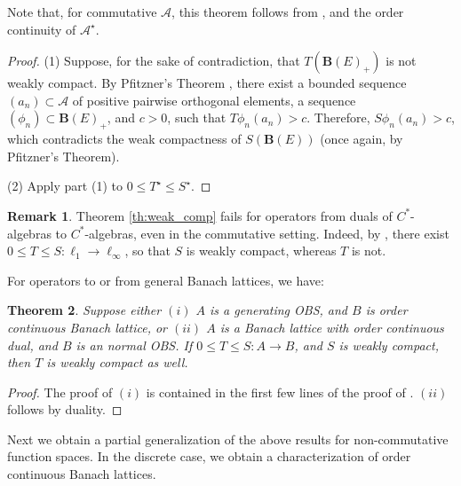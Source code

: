\documentclass[12pt]{amsart}
\theoremstyle{plain}
\newtheorem{theorem}{Theorem}[subsection]
\theoremstyle{definition}
\newtheorem{remark}[theorem]{Remark}
\renewcommand{\leq}{\leqslant}
\newcommand{\ball}{\mathbf{B}}
\newcommand{\A}{\mathcal{A}}
\begin{document}
Note that, for commutative $\A$, this theorem follows from
\cite{Wi81}, and the order continuity of $\A^\star$.

\begin{proof}
(1)
Suppose, for the sake of contradiction, that $T(\ball(E)_+)$
is not weakly compact.
By Pfitzner\rq{s} Theorem \cite{Pf},
there exist a bounded sequence $(a_n) \subset \A$
of positive pairwise orthogonal elements, a sequence
$(\phi_n) \subset \ball(E)_+$, and $c>0$, such that $T \phi_n (a_n) > c$.
Therefore, $S \phi_n(a_n) > c$,  which contradicts the weak compactness
of $S(\ball(E))$ (once again, by Pfitzner\rq{s} Theorem).

(2)
Apply part (1) to $0 \leq T^\star \leq S^\star$.
\end{proof}

\begin{remark}\label{rem:weak_comp}
Theorem \ref{th:weak_comp} fails for operators from duals
of $C^*$-algebras to $C^*$-algebras,
even in the commutative setting.
Indeed, by \cite[Theorem 5.31]{AB}, there exist
$0 \leq T \leq S : \ell_1 \to \ell_\infty$, so that $S$
is weakly compact, whereas $T$ is not.
\end{remark}

For operators to or from general Banach lattices, we have:

\begin{theorem}\label{th:weak_dom}
Suppose either $(i)$ $A$ is a generating OBS,
and $B$ is order continuous Banach lattice,
or $(ii)$ $A$ is a Banach lattice with order continuous dual, and $B$ is an
normal OBS. If $0 \le T \le S:A \to B$, and $S$ is weakly compact,
then $T$ is weakly compact as well.
\end{theorem}

\begin{proof}
The proof of $(i)$ is contained in the first few lines of
the proof of \cite[Theorem~5.31]{AB}. $(ii)$ follows by
duality.
\end{proof}


Next we obtain a partial generalization of the above results for
non-commutative function spaces. In the discrete case, we obtain a
characterization of order continuous Banach lattices.
\end{document}
